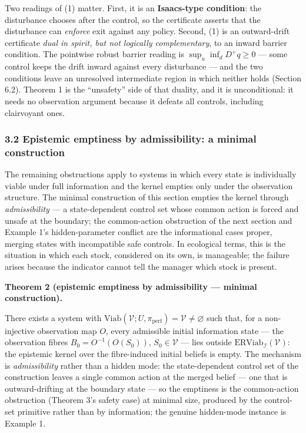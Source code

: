 \documentclass[11pt]{article}
\begin{document}
Two readings of (1) matter. First, it is an \textbf{Isaacs-type
condition}: the disturbance chooses after the control, so the
certificate asserts that the disturbance can \emph{enforce} exit against
any policy. Second, (1) is an outward-drift certificate \emph{dual in
spirit, but not logically complementary}, to an inward barrier
condition. The pointwise robust barrier reading is
\(\sup_u \inf_d D^+ q \ge 0\) --- some control keeps the drift inward
against every disturbance --- and the two conditions leave an unresolved
intermediate region in which neither holds (Section 6.2). Theorem 1 is
the ``unsafety'' side of that duality, and it is unconditional: it needs
no observation argument because it defeats all controls, including
clairvoyant ones.

\subsubsection{3.2 Epistemic emptiness by admissibility: a minimal
construction}\label{epistemic-emptiness-by-admissibility-a-minimal-construction}

The remaining obstructions apply to systems in which every state is
individually viable under full information and the kernel empties only under the observation structure.
The minimal construction of this section empties the kernel through
\emph{admissibility} --- a state-dependent control set whose common
action is forced and unsafe at the boundary; the common-action
obstruction of the next section and Example 1's hidden-parameter
conflict are the informational cases proper, merging states with
incompatible safe controls. In ecological terms, this is the situation
in which each stock, considered on its own, is manageable; the failure
arises because the indicator cannot tell the manager which stock is
present.

\textbf{Theorem 2 (epistemic emptiness by admissibility --- minimal
construction).}

There exists a system with
\(\mathrm{Viab}(\mathcal{V}; U, \pi_{\mathrm{perf}}) = \mathcal{V} \neq \varnothing\)
such that, for a non-injective observation map \(O\), every admissible
initial information state --- the observation fibres
\(B_0 = O^{-1}(O(S_0))\), \(S_0 \in \mathcal{V}\) --- lies outside
\(\mathrm{ERViab}_{\mathcal{I}}(\mathcal{V})\): the epistemic kernel
over the fibre-induced initial beliefs is empty. The mechanism is \emph{admissibility} rather than a hidden mode: the
state-dependent control set of the construction leaves a single common
action at the merged belief --- one that is outward-drifting at the
boundary state --- so the emptiness is the common-action obstruction
(Theorem 3's safety case) at minimal size, produced by the control-set primitive rather than by information; the genuine
hidden-mode instance is Example 1.
\end{document}
